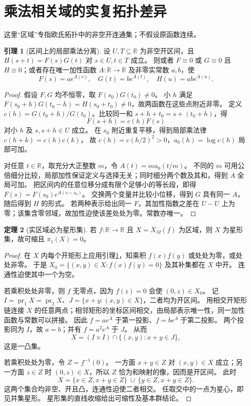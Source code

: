 \documentclass[UTF8,11pt,a4paper]{ctexart}
\theoremstyle{definition}
\newtheorem{theorem}{定理}[section]
\newtheorem{lemma}[theorem]{引理}
\newcommand{\R}{\mathbb R}
\begin{document}
\section{乘法相关域的实复拓扑差异}\label{sec:topology}
这里“区域”专指欧氏拓扑中的非空开连通集；不假设原函数连续。

\begin{lemma}[区间上的局部乘法分离]\label{lem:pexider}
设 $U,T\subseteq\R$ 为非空开区间，且 $H(s+t)=F(s)G(t)$ 对 $s\in U,t\in T$ 成立。
则或者 $F\equiv0$ 或 $G\equiv0$ 且 $H\equiv0$；或者存在唯一加性函数 $A:\R\to\R$ 及非零实常数 $a,b$，使
\[
 F(s)=ae^{A(s)},\quad G(t)=be^{A(t)},\quad H(u)=ab e^{A(u)}.
\]
\end{lemma}
\begin{proof}
假设 $F,G$ 均不恒零，取 $F(s_0)G(t_0)\ne0$。
小 $h$ 满足 $F(s_0+h)G(t_0-h)=H(s_0+t_0)\ne0$，故两函数在这些点附近非零。
定义 $c(h)=G(t_0+h)/G(t_0)$。比较同一和 $s+h+t_0=s+(t_0+h)$，得
\[
 F(s+h)=c(h)F(s)
\]
对小 $h$ 及 $s,s+h\in U$ 成立。
在 $s_0$ 附近重复平移，得到局部乘法律 $c(h+k)=c(h)c(k)$，
故 $c(h)=c(h/2)^2>0$，$a_0(h)=\log c(h)$ 局部可加。

对任意 $t\in\R$，取充分大正整数 $m$，令 $A(t)=m a_0(t/m)$。
不同的 $m$ 可用公倍细分比较，局部加性保证定义与选择无关；同时细分两个数及其和，得到 $A$ 全局可加。
把区间内的任意位移分成有限个足够小的等长段，即得
$F(s)=F(s_0)e^{A(s-s_0)}$。
交换两个变量并比较小位移，得到 $G$ 具有同一 $A$，随后得到 $H$ 的形式。
若两种表示给出同一 $F$，其加性指数之差在 $U-U$ 上为零；该集含零邻域，故加性迫使该差处处为零。常数亦唯一。
\end{proof}

\begin{theorem}[实区域必为星形集]\label{thm:topreal}
若 $f:\R\to\R$ 且 $X=X_M(f)$ 为区域，则 $X$ 为星形集，故可缩且 $\pi_1(X)=0$。
\end{theorem}
\begin{proof}
在 $X$ 内每个开矩形上应用引理\ref{lem:pexider}，知乘积 $f(x)f(y)$ 或处处为零，或处处非零。
于是 $X_0=\{(x,y)\in X:f(x)f(y)=0\}$ 及其补集都在 $X$ 中开。
连通性迫使其中一个为空。

若乘积处处非零，则 $f$ 无零点，因为 $f(z)=0$ 会使 $(0,z)\in X_0$。
记 $I=\operatorname{pr}_1X=\operatorname{pr}_2X$、$J=\{x+y:(x,y)\in X\}$，二者均为开区间。
用相交开矩形链连接 $X$ 的任意两点；相邻矩形的坐标区间相交，由局部表示唯一性，同一加性函数与常数可以拼接。
因此 $f=ae^A$ 于第一投影、$f=be^A$ 于第二投影。
两个投影同为 $I$，故 $a=b$；并有 $f=a^2e^A$ 于 $J$。
从而
\[
 X=(I\times I)\cap\{(x,y):x+y\in J\},
\]
这是一凸集。

若乘积处处为零，令 $Z=f^{-1}(0)$。
一方面 $x+y\in Z$ 对 $(x,y)\in X$ 成立；另一方面 $z\in Z$ 时 $(0,z)\in X$，所以 $Z$ 恰为和映射的像，因而是开区间。
此时
\[
 X=\{x\in Z,x+y\in Z\}\ \cup\ \{y\in Z,x+y\in Z\}.
\]
这两个集合均非空、开且凸，连通性迫使二者相交。
任取交中的一点为星心，即见并集星形。
星形集的直线收缩给出可缩性及基本群结论。
\end{proof}
\end{document}
